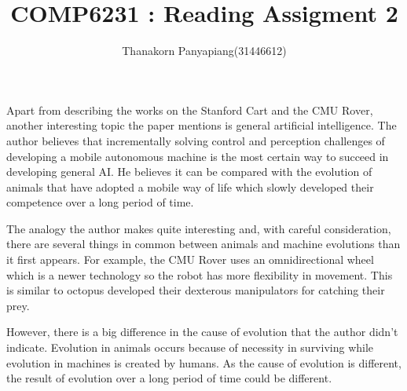 \documentclass{article}
\title{COMP6231 : Reading Assigment 2}
\author{Thanakorn Panyapiang(31446612)}
\begin{document}
\maketitle

Apart from describing the works on the Stanford Cart and the CMU Rover, another interesting topic the paper mentions is general artificial intelligence. The author believes that incrementally solving control and perception challenges of developing a mobile autonomous machine is the most certain way to succeed in developing general AI. He believes it can be compared with the evolution of animals that have adopted a mobile way of life which slowly developed their competence over a long period of time.

The analogy the author makes quite interesting and, with careful consideration, there are several things in common between animals and machine evolutions than it first appears. For example, the CMU Rover uses an omnidirectional wheel which is a newer technology so the robot has more flexibility in movement. This is similar to octopus developed their dexterous manipulators for catching their prey.

However, there is a big difference in the cause of evolution that the author didn't indicate. Evolution in animals occurs because of necessity in surviving while evolution in machines is created by humans. As the cause of evolution is different, the result of evolution over a long period of time could be different.
\end{document}

